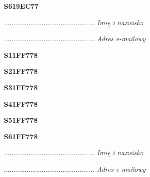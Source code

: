 \begin{turn}{90}\huge \textbf{S619EC77}\end{turn}

\begin{turn}{90}\begin{minipage}{\linewidth} \vspace{20mm} ................................................  \textit{Imię i nazwisko}\end{minipage}\end{turn}

\begin{turn}{90}\begin{minipage}{\linewidth} \vspace{20mm} ................................................  \textit{Adres e-mailowy}\end{minipage}\end{turn}

\begin{turn}{90}\huge \textbf{S11FF778}\end{turn}

\begin{turn}{90}\huge \textbf{S21FF778}\end{turn}

\begin{turn}{90}\huge \textbf{S31FF778}\end{turn}

\begin{turn}{90}\huge \textbf{S41FF778}\end{turn}

\begin{turn}{90}\huge \textbf{S51FF778}\end{turn}

\begin{turn}{90}\huge \textbf{S61FF778}\end{turn}

\begin{turn}{90}\begin{minipage}{\linewidth} \vspace{20mm} ................................................  \textit{Imię i nazwisko}\end{minipage}\end{turn}

\begin{turn}{90}\begin{minipage}{\linewidth} \vspace{20mm} ................................................  \textit{Adres e-mailowy}\end{minipage}\end{turn}

